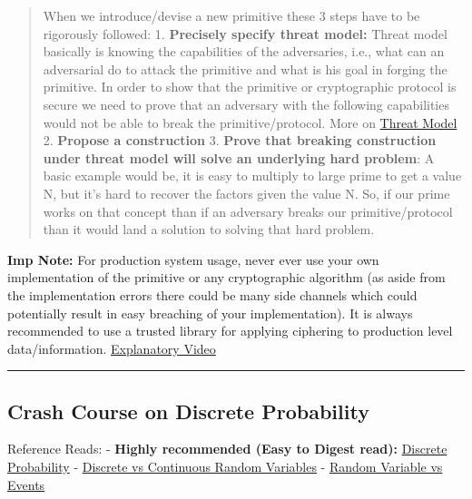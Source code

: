 \documentclass[11pt]{article}
\begin{document}
\begin{quote}
When we introduce/devise a new primitive these 3 steps have to be
rigorously followed: 1. \textbf{Precisely specify threat model:} Threat
model basically is knowing the capabilities of the adversaries, i.e.,
what can an adversarial do to attack the primitive and what is his goal
in forging the primitive. In order to show that the primitive or
cryptographic protocol is secure we need to prove that an adversary with
the following capabilities would not be able to break the
primitive/protocol. More on
\href{https://www.youtube.com/watch?v=f4tk2pnOUos}{Threat Model} 2.
\textbf{Propose a construction} 3. \textbf{Prove that breaking
construction under threat model will solve an underlying hard problem}:
A basic example would be, it is easy to multiply to large prime to get a
value N, but it's hard to recover the factors given the value N. So, if
our prime works on that concept than if an adversary breaks our
primitive/protocol than it would land a solution to solving that hard
problem.
\end{quote}

\textbf{Imp Note:} For production system usage, never ever use your own
implementation of the primitive or any cryptographic algorithm (as aside
from the implementation errors there could be many side channels which
could potentially result in easy breaching of your implementation). It
is always recommended to use a trusted library for applying ciphering to
production level data/information.
\href{https://www.youtube.com/watch?v=3Re5xlEjC8w}{Explanatory Video}

\begin{center}\rule{0.5\linewidth}{\linethickness}\end{center}

    \hypertarget{crash-course-on-discrete-probability}{%
\subsection{Crash Course on Discrete
Probability}\label{crash-course-on-discrete-probability}}

Reference Reads: - \textbf{Highly recommended (Easy to Digest read):}
\href{https://en.wikibooks.org/wiki/High_School_Mathematics_Extensions/Discrete_Probability}{Discrete
Probability} -
\href{http://www.henry.k12.ga.us/ugh/apstat/chapternotes/7supplement.html}{Discrete
vs Continuous Random Variables} -
\href{https://www.quora.com/What-is-the-difference-between-an-event-and-a-random-variable}{Random
Variable vs Events}
\end{document}
